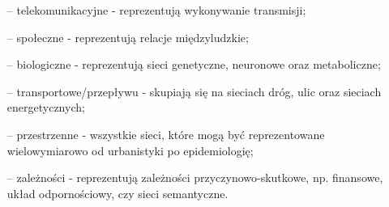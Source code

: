 \documentclass[12pt, oneside, final, openany]{mgr}
\begin{document}
\begin{itemize}
\begin{itemize}
	\item[--] telekomunikacyjne - reprezentują wykonywanie transmisji;
	\item[--] społeczne - reprezentują relacje międzyludzkie;
	\item[--] biologiczne - reprezentują sieci genetyczne, neuronowe oraz metaboliczne;
	\item[--] transportowe/przepływu - skupiają się na sieciach dróg, ulic oraz sieciach energetycznych;
	\item[--] przestrzenne - wszystkie sieci, które mogą być reprezentowane wielowymiarowo od urbanistyki po epidemiologię;
	\item[--] zależności - reprezentują zależności przyczynowo-skutkowe, np. finansowe, układ odpornościowy, czy sieci semantyczne.	
	\end{itemize}
\end{itemize}
\end{document}
